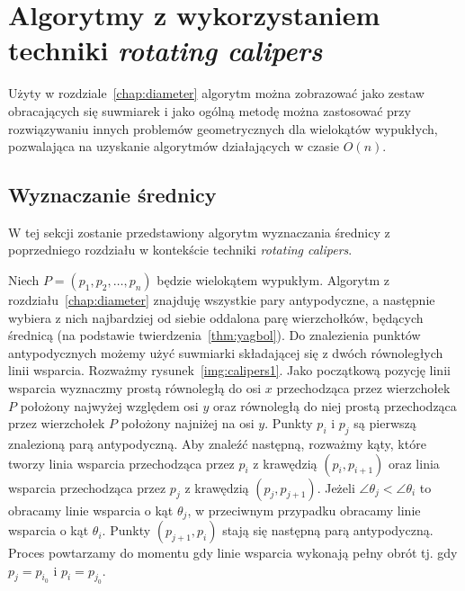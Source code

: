 \chapter{Algorytmy z wykorzystaniem techniki \emph{rotating
    calipers}\label{chap:calipers}}
Użyty w rozdziale~\ref{chap:diameter} algorytm można zobrazować jako
zestaw obracających się suwmiarek i jako ogólną metodę można
zastosować przy rozwiązywaniu innych problemów geometrycznych dla
wielokątów wypukłych, pozwalająca na uzyskanie algorytmów działających
w czasie $O(n)$.

\section{Wyznaczanie średnicy}
W tej sekcji zostanie przedstawiony algorytm wyznaczania średnicy z
poprzedniego rozdziału w kontekście techniki \emph{rotating calipers}.

Niech $P = (p_1, p_2, \ldots, p_n)$ będzie wielokątem
wypukłym. Algorytm z rozdziału~\ref{chap:diameter} znajduję wszystkie
pary antypodyczne, a następnie wybiera z nich najbardziej od siebie
oddalona parę wierzchołków, będących średnicą (na podstawie
twierdzenia~\ref{thm:yagbol}). Do znalezienia punktów antypodycznych
możemy użyć suwmiarki składającej się z dwóch równoległych linii
wsparcia. Rozważmy rysunek~\ref{img:calipers1}. Jako początkową pozycję linii wsparcia
wyznaczmy prostą równoległą do osi $x$ przechodząca przez wierzchołek
$P$ położony najwyżej względem osi $y$ oraz równoległą do niej prostą
przechodząca przez wierzchołek $P$ położony najniżej na osi
$y$. Punkty $p_i$ i $p_j$ są pierwszą znalezioną parą
antypodyczną. Aby znaleźć następną, rozważmy kąty, które tworzy linia
wsparcia przechodząca przez $p_i$ z krawędzią $(p_i, p_{i+1})$ oraz
linia wsparcia przechodząca przez $p_j$ z krawędzią $(p_j, p_{j+1})$.
Jeżeli $\angle{\theta_j} < \angle{\theta_i}$ to obracamy linie
wsparcia o kąt $\theta_j$, w przeciwnym przypadku obracamy linie
wsparcia o kąt $\theta_i$. Punkty $(p_{j+1}, p_i)$ stają się następną
parą antypodyczną. Proces powtarzamy do momentu gdy linie wsparcia
wykonają pełny obrót tj. gdy $p_j = p_{i_0}$ i $p_i = p_{j_0}$.

